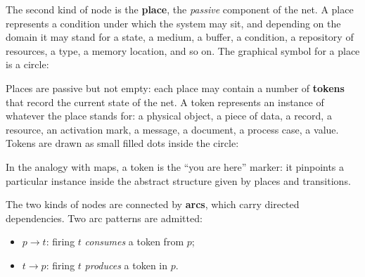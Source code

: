 \begin{center}
\end{center}

The second kind of node is the \textbf{place}, the \emph{passive} component of the net. A place represents a condition under which the system may sit, and depending on the domain it may stand for a state, a medium, a buffer, a condition, a repository of resources, a type, a memory location, and so on. The graphical symbol for a place is a circle:

\begin{center}
\end{center}

Places are passive but not empty: each place may contain a number of \textbf{tokens} that record the current state of the net. A token represents an instance of whatever the place stands for: a physical object, a piece of data, a record, a resource, an activation mark, a message, a document, a process case, a value. Tokens are drawn as small filled dots inside the circle:

\begin{center}
\end{center}

In the analogy with maps, a token is the ``you are here'' marker: it pinpoints a particular instance inside the abstract structure given by places and transitions.

The two kinds of nodes are connected by \textbf{arcs}, which carry directed dependencies. Two arc patterns are admitted:

\begin{itemize}
  \item $p \to t$: firing $t$ \emph{consumes} a token from $p$;
  \item $t \to p$: firing $t$ \emph{produces} a token in $p$.
\end{itemize}

